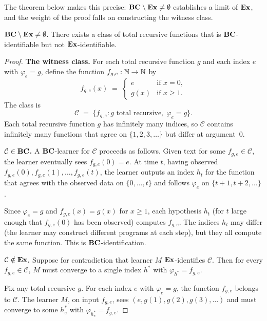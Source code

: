The theorem below makes this precise: $\mathbf{BC} \setminus \mathbf{Ex} \neq \emptyset$
establishes a limit of $\mathbf{Ex}$, and the weight of the proof falls on
constructing the witness class.

\begin{thm}
\label{thm:bc-separation}
$\mathbf{BC} \setminus \mathbf{Ex} \neq \emptyset$.  There exists a class of total
recursive functions that is $\mathbf{BC}$-identifiable but not
$\mathbf{Ex}$-identifiable.
\end{thm}

\begin{proof}
\textbf{The witness class.}
For each total recursive function $g$ and each index $e$ with
$\varphi_e = g$, define the function $f_{g,e} : \mathbb{N} \to \mathbb{N}$ by
\[
  f_{g,e}(x) \;=\;
  \begin{cases}
    e & \text{if } x = 0, \\
    g(x) & \text{if } x \geq 1.
  \end{cases}
\]
The class is
\[
  \mathcal{C} \;=\; \bigl\{f_{g,e} : g \text{ total recursive},\;
  \varphi_e = g\bigr\}.
\]
Each total recursive function $g$ has infinitely many indices, so
$\mathcal{C}$ contains infinitely many functions that agree on
$\{1, 2, 3, \ldots\}$ but differ at argument~$0$.

\medskip
\textbf{$\mathcal{C} \in \mathbf{BC}$.}
A $\mathbf{BC}$-learner for $\mathcal{C}$ proceeds as follows.  Given text
for some $f_{g,e} \in \mathcal{C}$, the learner eventually sees
$f_{g,e}(0) = e$.  At time $t$, having observed
$f_{g,e}(0), f_{g,e}(1), \ldots, f_{g,e}(t)$, the learner outputs
an index $h_t$ for the function that agrees with the observed data
on $\{0, \ldots, t\}$ and follows $\varphi_e$ on $\{t+1, t+2, \ldots\}$.

Since $\varphi_e = g$ and $f_{g,e}(x) = g(x)$ for $x \geq 1$, each
hypothesis $h_t$ (for $t$ large enough that $f_{g,e}(0)$ has been
observed) computes $f_{g,e}$.  The indices $h_t$ may differ (the
learner may construct different programs at each step), but they all
compute the same function.  This is $\mathbf{BC}$-identification.

\medskip
\textbf{$\mathcal{C} \notin \mathbf{Ex}$.}
Suppose for contradiction that learner $M$ $\mathbf{Ex}$-identifies
$\mathcal{C}$.  Then for every $f_{g,e} \in \mathcal{C}$, $M$ must
converge to a single index $h^*$ with $\varphi_{h^*} = f_{g,e}$.

Fix any total recursive $g$.  For each index $e$ with $\varphi_e = g$,
the function $f_{g,e}$ belongs to $\mathcal{C}$.  The learner $M$,
on input $f_{g,e}$, sees $(e, g(1), g(2), g(3), \ldots)$ and must
converge to some $h_e^*$ with $\varphi_{h_e^*} = f_{g,e}$.


\end{proof}
